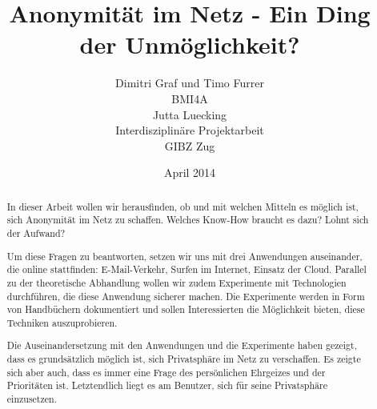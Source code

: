 \documentclass[12pt,titlepage]{article}
\begin{document}
\title{Anonymität im Netz - Ein Ding der Unmöglichkeit?}
\author{Dimitri Graf und Timo Furrer\\
  BMI4A\\
  Jutta Luecking\\
  Interdisziplinäre Projektarbeit\\
  GIBZ Zug}
\date{April 2014}
\maketitle

\tableofcontents
\newpage

\begin{abstract}
In dieser Arbeit wollen wir herausfinden, ob und mit welchen Mitteln es möglich ist, sich Anonymität im Netz zu schaffen. Welches Know-How braucht es dazu? Lohnt sich der Aufwand? 

Um diese Fragen zu beantworten, setzen wir uns mit drei Anwendungen auseinander, die online stattfinden: E-Mail-Verkehr, Surfen im Internet, Einsatz der Cloud. Parallel zu der theoretische Abhandlung wollen wir zudem Experimente mit Technologien durchführen, die diese Anwendung sicherer machen. Die Experimente werden in Form von Handbüchern dokumentiert und sollen Interessierten die Möglichkeit bieten, diese Techniken auszuprobieren.

Die Auseinandersetzung mit den Anwendungen und die Experimente haben gezeigt, dass es grundsätzlich möglich ist, sich Privatsphäre im Netz zu verschaffen. Es zeigte sich aber auch, dass es immer eine Frage des persönlichen Ehrgeizes und der Prioritäten ist. Letztendlich liegt es am Benutzer, sich für seine Privatsphäre einzusetzen.  

\end{abstract}



\listoffigures
\end{document}
